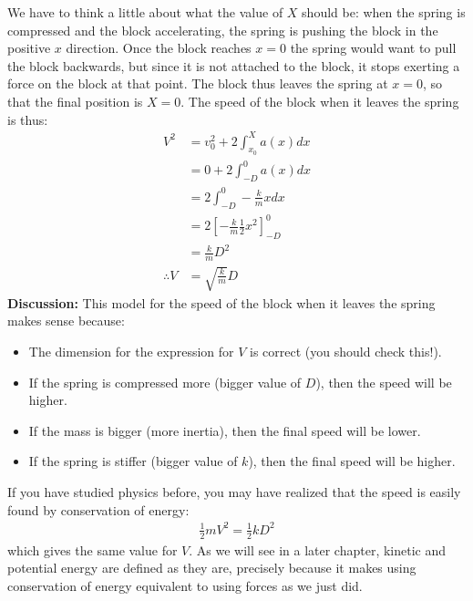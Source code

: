 \begin{example}
We have to think a little about what the value of $X$ should be: when the spring is compressed and the block accelerating, the spring is pushing the block in the positive $x$ direction. Once the block reaches $x=0$ the spring would want to pull the block backwards, but since it is not attached to the block, it stops exerting a force on the block at that point. The block thus leaves the spring at $x=0$, so that the final position is $X=0$. The speed of the block when it leaves the spring is thus:
\begin{align*}
V^2 &= v_0^2 + 2\int_{x_0}^{X}a(x)dx\\
&= 0 + 2\int_{-D}^{0}a(x)dx\\
&= 2\int_{-D}^{0}-\frac{k}{m}xdx\\
&= 2\left[ - \frac{k}{m}\frac{1}{2}x^2\right]_{-D}^{0}\\
&= \frac{k}{m}D^2\\
\therefore V &= \sqrt{\frac{k}{m}}D
\end{align*}
\textbf{Discussion:} This model for the speed of the block when it leaves the spring makes sense because:
\begin{itemize}
\item The dimension for the expression for $V$ is correct (you should check this!).
\item If the spring is compressed more (bigger value of $D$), then the speed will be higher.
\item If the mass is bigger (more inertia), then the final speed will be lower.
\item If the spring is stiffer (bigger value of $k$), then the final speed will be higher.
\end{itemize}
If you have studied physics before, you may have realized that the speed is easily found by conservation of energy:
\begin{align*}
\frac{1}{2}mV^2=\frac{1}{2}kD^2
\end{align*}
which gives the same value for $V$. As we will see in a later chapter, kinetic and potential energy are defined as they are, precisely because it makes using conservation of energy equivalent to using forces as we just did.
\end{example}

